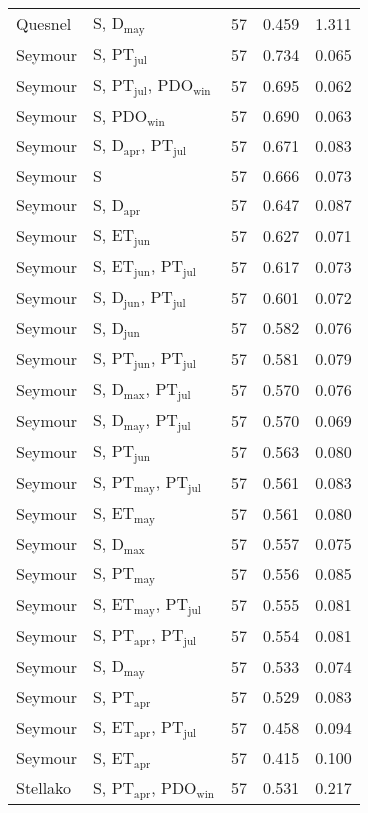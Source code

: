 \begin{longtable}{llrrr}
Quesnel & S, D$_\mathrm{may}$ & 57 & 0.459 & 1.311 \\ 
Seymour & S, PT$_\mathrm{jul}$ & 57 & 0.734 & 0.065 \\ 
Seymour & S, PT$_\mathrm{jul}$, PDO$_\mathrm{win}$ & 57 & 0.695 & 0.062 \\ 
Seymour & S, PDO$_\mathrm{win}$ & 57 & 0.690 & 0.063 \\ 
Seymour & S, D$_\mathrm{apr}$, PT$_\mathrm{jul}$ & 57 & 0.671 & 0.083 \\ 
Seymour & S & 57 & 0.666 & 0.073 \\
Seymour & S, D$_\mathrm{apr}$ & 57 & 0.647 & 0.087 \\ 
Seymour & S, ET$_\mathrm{jun}$ & 57 & 0.627 & 0.071 \\ 
Seymour & S, ET$_\mathrm{jun}$, PT$_\mathrm{jul}$ & 57 & 0.617 & 0.073 \\ 
Seymour & S, D$_\mathrm{jun}$, PT$_\mathrm{jul}$ & 57 & 0.601 & 0.072 \\ 
Seymour & S, D$_\mathrm{jun}$ & 57 & 0.582 & 0.076 \\ 
Seymour & S, PT$_\mathrm{jun}$, PT$_\mathrm{jul}$ & 57 & 0.581 & 0.079 \\ 
Seymour & S, D$_\mathrm{max}$, PT$_\mathrm{jul}$ & 57 & 0.570 & 0.076 \\ 
Seymour & S, D$_\mathrm{may}$, PT$_\mathrm{jul}$ & 57 & 0.570 & 0.069 \\ 
Seymour & S, PT$_\mathrm{jun}$ & 57 & 0.563 & 0.080 \\ 
Seymour & S, PT$_\mathrm{may}$, PT$_\mathrm{jul}$ & 57 & 0.561 & 0.083 \\ 
Seymour & S, ET$_\mathrm{may}$ & 57 & 0.561 & 0.080 \\ 
Seymour & S, D$_\mathrm{max}$ & 57 & 0.557 & 0.075 \\ 
Seymour & S, PT$_\mathrm{may}$ & 57 & 0.556 & 0.085 \\ 
Seymour & S, ET$_\mathrm{may}$, PT$_\mathrm{jul}$ & 57 & 0.555 & 0.081 \\ 
Seymour & S, PT$_\mathrm{apr}$, PT$_\mathrm{jul}$ & 57 & 0.554 & 0.081 \\ 
Seymour & S, D$_\mathrm{may}$ & 57 & 0.533 & 0.074 \\ 
Seymour & S, PT$_\mathrm{apr}$ & 57 & 0.529 & 0.083 \\ 
Seymour & S, ET$_\mathrm{apr}$, PT$_\mathrm{jul}$ & 57 & 0.458 & 0.094 \\ 
Seymour & S, ET$_\mathrm{apr}$ & 57 & 0.415 & 0.100 \\ 
Stellako & S, PT$_\mathrm{apr}$, PDO$_\mathrm{win}$ & 57 & 0.531 & 0.217 \\ 

\end{longtable}
